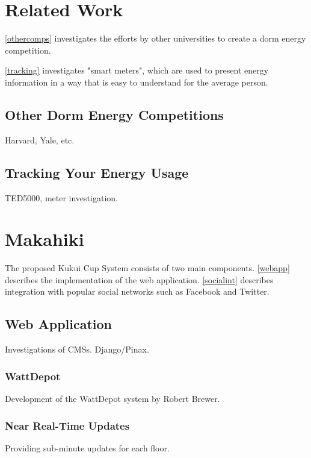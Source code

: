 \chapter{Related Work}
\label{relatedwork}

\autoref{othercomps} investigates the efforts by other universities to create a dorm energy competition.

\autoref{tracking} investigates "smart meters", which are used to present energy information in a way that is easy to understand for the average person.

\section{Other Dorm Energy Competitions}
\label{othercomps}
Harvard, Yale, etc.

\section{Tracking Your Energy Usage}
\label{tracking}
TED5000, meter investigation.

\chapter{Makahiki}
\label{makahiki}

The proposed Kukui Cup System consists of two main components.  \autoref{webapp} describes the implementation of the web application.  \autoref{socialint} describes integration with popular social networks such as Facebook and Twitter.

\section{Web Application}
\label{webapp}

Investigations of CMSs.  Django/Pinax.

\subsection{WattDepot}

Development of the WattDepot system by Robert Brewer.

\subsection{Near Real-Time Updates}

Providing sub-minute updates for each floor.

